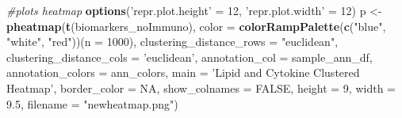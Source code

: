 \documentclass[]{article}
\newenvironment{Shaded}{\begin{snugshade}}{\end{snugshade}}
\newcommand{\KeywordTok}[1]{\textcolor[rgb]{0.13,0.29,0.53}{\textbf{{#1}}}}
\newcommand{\DataTypeTok}[1]{\textcolor[rgb]{0.13,0.29,0.53}{{#1}}}
\newcommand{\DecValTok}[1]{\textcolor[rgb]{0.00,0.00,0.81}{{#1}}}
\newcommand{\FloatTok}[1]{\textcolor[rgb]{0.00,0.00,0.81}{{#1}}}
\newcommand{\StringTok}[1]{\textcolor[rgb]{0.31,0.60,0.02}{{#1}}}
\newcommand{\CommentTok}[1]{\textcolor[rgb]{0.56,0.35,0.01}{\textit{{#1}}}}
\newcommand{\OtherTok}[1]{\textcolor[rgb]{0.56,0.35,0.01}{{#1}}}
\newcommand{\NormalTok}[1]{{#1}}
\begin{document}
\begin{Shaded}
\begin{Highlighting}[]
\CommentTok{#plots heatmap}
\KeywordTok{options}\NormalTok{(}\StringTok{'repr.plot.height'} \NormalTok{=}\StringTok{ }\DecValTok{12}\NormalTok{, }\StringTok{'repr.plot.width'} \NormalTok{=}\StringTok{ }\DecValTok{12}\NormalTok{)}
\NormalTok{p <-}\StringTok{ }\KeywordTok{pheatmap}\NormalTok{(}\KeywordTok{t}\NormalTok{(biomarkers_noImmuno),}
              \DataTypeTok{color =} \KeywordTok{colorRampPalette}\NormalTok{(}\KeywordTok{c}\NormalTok{(}\StringTok{"blue"}\NormalTok{, }\StringTok{"white"}\NormalTok{, }\StringTok{"red"}\NormalTok{))(}\DataTypeTok{n =} \DecValTok{1000}\NormalTok{),}
              \DataTypeTok{clustering_distance_rows =} \StringTok{"euclidean"}\NormalTok{,}
              \DataTypeTok{clustering_distance_cols =} \StringTok{'euclidean'}\NormalTok{,}
              \DataTypeTok{annotation_col =} \NormalTok{sample_ann_df,}
              \DataTypeTok{annotation_colors =} \NormalTok{ann_colors,}
              \DataTypeTok{main =} \StringTok{'Lipid and Cytokine Clustered Heatmap'}\NormalTok{, }
              \DataTypeTok{border_color =} \OtherTok{NA}\NormalTok{,}
              \DataTypeTok{show_colnames =} \OtherTok{FALSE}\NormalTok{,}
              \DataTypeTok{height =} \DecValTok{9}\NormalTok{,}
              \DataTypeTok{width =} \FloatTok{9.5}\NormalTok{,}
              \DataTypeTok{filename =} \StringTok{"newheatmap.png"}\NormalTok{)}
\end{Highlighting}
\end{Shaded}
\end{document}
